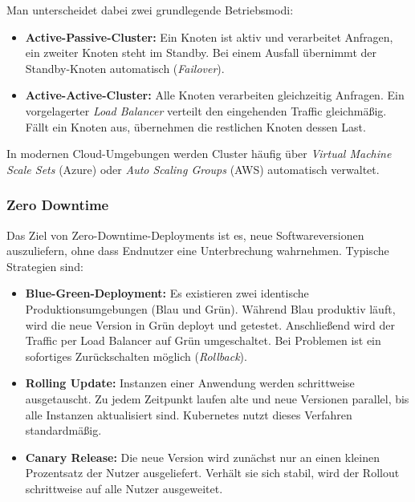 Man unterscheidet dabei zwei grundlegende Betriebsmodi:

\begin{itemize}
    \item \textbf{Active-Passive-Cluster:} Ein Knoten ist aktiv und verarbeitet
    Anfragen, ein zweiter Knoten steht im Standby. Bei einem Ausfall übernimmt
    der Standby-Knoten automatisch (\textit{Failover}).

    \item \textbf{Active-Active-Cluster:} Alle Knoten verarbeiten gleichzeitig
    Anfragen. Ein vorgelagerter \textit{Load Balancer} verteilt den eingehenden
    Traffic gleichmäßig. Fällt ein Knoten aus, übernehmen die restlichen
    Knoten dessen Last.
\end{itemize}

In modernen Cloud-Umgebungen werden Cluster häufig über
\textit{Virtual Machine Scale Sets} (Azure) oder
\textit{Auto Scaling Groups} (AWS) automatisch verwaltet.

\subsubsection{Zero Downtime}
Das Ziel von Zero-Downtime-Deployments ist es, neue Softwareversionen
auszuliefern, ohne dass Endnutzer eine Unterbrechung wahrnehmen. Typische
Strategien sind:

\begin{itemize}
    \item \textbf{Blue-Green-Deployment:} Es existieren zwei identische
    Produktionsumgebungen (Blau und Grün). Während Blau produktiv läuft, wird
    die neue Version in Grün deployt und getestet. Anschließend wird der
    Traffic per Load Balancer auf Grün umgeschaltet. Bei Problemen ist ein
    sofortiges Zurückschalten möglich (\textit{Rollback}).

    \item \textbf{Rolling Update:} Instanzen einer Anwendung werden
    schrittweise ausgetauscht. Zu jedem Zeitpunkt laufen alte und neue
    Versionen parallel, bis alle Instanzen aktualisiert sind. Kubernetes nutzt
    dieses Verfahren standardmäßig.

    \item \textbf{Canary Release:} Die neue Version wird zunächst nur an einen
    kleinen Prozentsatz der Nutzer ausgeliefert. Verhält sie sich stabil, wird
    der Rollout schrittweise auf alle Nutzer ausgeweitet.
\end{itemize}



